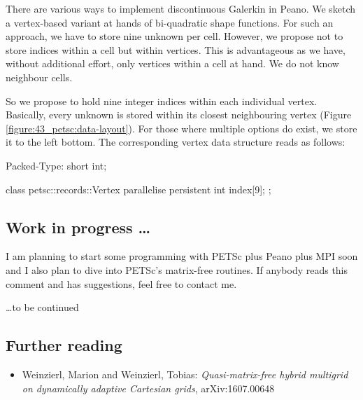 There are various ways to implement discontinuous Galerkin in Peano. 
We sketch a vertex-based variant  at
hands of bi-quadratic shape functions.
For such an approach, we have to store nine unknown per cell.
However, we propose not to store indices within a cell but within vertices.
This is advantageous as we have, without additional effort, only vertices within
a cell at hand. 
We do not know neighbour cells.

So we propose to hold nine integer indices within each individual vertex.
Basically, every unknown is stored within its closest neighbouring vertex
(Figure \ref{figure:43_petsc:data-layout}). 
For those where multiple options do exist, we store it to the left bottom.
The corresponding vertex data structure reads as follows:
\begin{code}
Packed-Type: short int;

class petsc::records::Vertex {  
  parallelise persistent int index[9];
};
\end{code}



\subsection{Work in progress \ldots}

I am planning to start some programming with PETSc plus Peano plus MPI soon and
I also plan to dive into PETSc's matrix-free routines. If anybody reads this
comment and has suggestions, feel free to contact me.

\ldots to be continued



\subsection*{Further reading}

\begin{itemize}
  \item Weinzierl, Marion and Weinzierl, Tobias: {\em Quasi-matrix-free hybrid
  multigrid on dynamically adaptive Cartesian grids}, arXiv:1607.00648
\end{itemize}


% 
% 
% 
% 
% 

